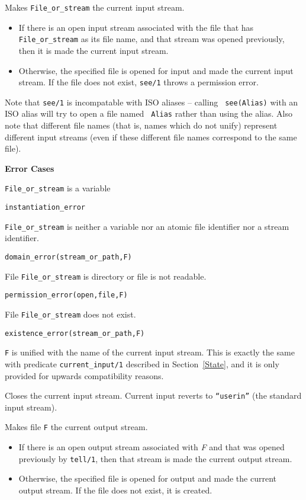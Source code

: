 \begin{description}
%
Makes {\tt File\_or\_stream} the current input stream. 
%
\begin{itemize}
\item If there is an open input stream associated with the file that
  has {\tt File\_or\_stream} as its file name, and that stream was
  opened previously, then it is made the current input stream.
%
\item Otherwise, the specified file is opened for input and made the
  current input stream. If the file does not exist, {\tt see/1} throws
  a permission error.
\end{itemize}
%
Note that {\tt see/1} is incompatable with ISO aliases -- calling {\tt
  see(Alias)} with an ISO alias will try to open a file named {\tt
  Alias} rather than using the alias.  Also note that different file
names (that is, names which do not unify) represent different input
streams (even if these different file names correspond to the same
file).

{\bf Error Cases}
\bi
\item  {\tt File\_or\_stream} is  a variable
\bi
\item {\tt instantiation\_error}
\ei
\item {\tt File\_or\_stream} is neither a variable nor an atomic file identifier nor
  a stream identifier.
\bi
\item {\tt domain\_error(stream\_or\_path,F)}
\ei
\item File {\tt File\_or\_stream} is directory or file is not readable. 
\bi
\item {\tt permission\_error(open,file,F)}
\ei
\item File {\tt File\_or\_stream} does not exist. 
\bi
\item {\tt existence\_error(stream\_or\_path,F)}
\ei
\ei

    {\tt F} is unified with the name of the current input stream.
    This is exactly the same with predicate {\tt current\_input/1}
    described in Section~\ref{State}, and it is only provided for
    upwards compatibility reasons.

    Closes the current input stream. 
    Current input reverts to {\tt ``userin''} (the standard input stream).

    Makes file {\tt F} the current output stream. 
    \begin{itemize}
    \item If there is an open output stream associated with {\em F}  
          and that was opened previously 
          by {\tt tell/1}, then that stream is made the current output 
	  stream. 
    \item Otherwise, the specified file is opened for output and made the
          current output stream. If the file does not exist, it is created.
    \end{itemize}


\end{description}
